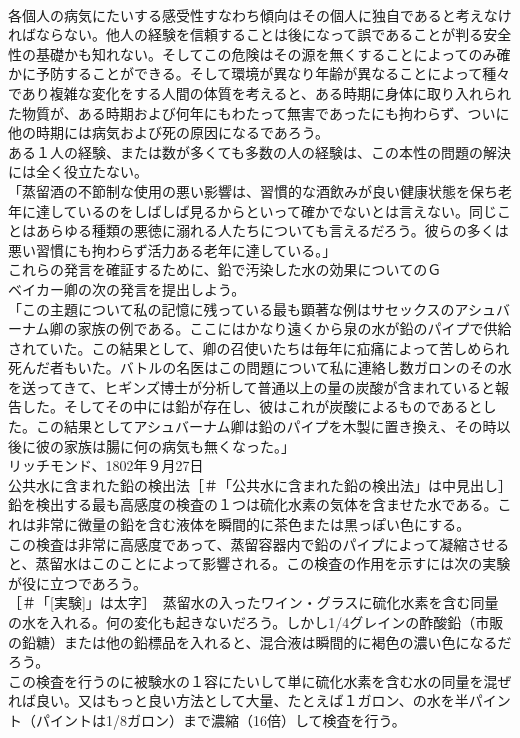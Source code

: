 \documentclass[8pt]{extreport}
\begin{document}
\begin{CJK}{UTF8}{min}
\\	各個人の病気にたいする感受性すなわち傾向はその個人に独自であると考えなければならない。他人の経験を信頼することは後になって誤であることが判る安全性の基礎かも知れない。そしてこの危険はその源を無くすることによってのみ確かに予防することができる。そして環境が異なり年齢が異なることによって種々であり複雑な変化をする人間の体質を考えると、ある時期に身体に取り入れられた物質が、ある時期および何年にもわたって無害であったにも拘わらず、ついに他の時期には病気および死の原因になるであろう。
\\	ある１人の経験、または数が多くても多数の人の経験は、この本性の問題の解決には全く役立たない。
\\	「蒸留酒の不節制な使用の悪い影響は、習慣的な酒飲みが良い健康状態を保ち老年に達しているのをしばしば見るからといって確かでないとは言えない。同じことはあらゆる種類の悪徳に溺れる人たちについても言えるだろう。彼らの多くは悪い習慣にも拘わらず活力ある老年に達している。」
\\	これらの発言を確証するために、鉛で汚染した水の効果についてのＧ
\\	ベイカー卿の次の発言を提出しよう。
\\	「この主題について私の記憶に残っている最も顕著な例はサセックスのアシュバーナム卿の家族の例である。ここにはかなり遠くから泉の水が鉛のパイプで供給されていた。この結果として、卿の召使いたちは毎年に疝痛によって苦しめられ死んだ者もいた。バトルの名医はこの問題について私に連絡し数ガロンのその水を送ってきて、ヒギンズ博士が分析して普通以上の量の炭酸が含まれていると報告した。そしてその中には鉛が存在し、彼はこれが炭酸によるものであるとした。この結果としてアシュバーナム卿は鉛のパイプを木製に置き換え、その時以後に彼の家族は腸に何の病気も無くなった。」
\\	リッチモンド、1802年９月27日
\\	公共水に含まれた鉛の検出法［＃「公共水に含まれた鉛の検出法」は中見出し］
\\	鉛を検出する最も高感度の検査の１つは硫化水素の気体を含ませた水である。これは非常に微量の鉛を含む液体を瞬間的に茶色または黒っぽい色にする。
\\	この検査は非常に高感度であって、蒸留容器内で鉛のパイプによって凝縮させると、蒸留水はこのことによって影響される。この検査の作用を示すには次の実験が役に立つであろう。
\\	[実験]［＃「[実験]」は太字］　蒸留水の入ったワイン・グラスに硫化水素を含む同量の水を入れる。何の変化も起きないだろう。しかし1/4グレインの酢酸鉛（市販の鉛糖）または他の鉛標品を入れると、混合液は瞬間的に褐色の濃い色になるだろう。
\\	この検査を行うのに被験水の１容にたいして単に硫化水素を含む水の同量を混ぜれば良い。又はもっと良い方法として大量、たとえば１ガロン、の水を半パイント（パイントは1/8ガロン）まで濃縮（16倍）して検査を行う。

\end{CJK}
\end{document}
